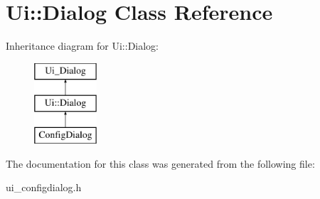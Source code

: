 \hypertarget{class_ui_1_1_dialog}{
\section{Ui::Dialog Class Reference}
\label{class_ui_1_1_dialog}
}
Inheritance diagram for Ui::Dialog:\begin{figure}[H]
\begin{center}
\leavevmode
\includegraphics[height=3.000000cm]{class_ui_1_1_dialog}
\end{center}
\end{figure}


The documentation for this class was generated from the following file:\begin{DoxyCompactItemize}
\item 
ui\_\-configdialog.h\end{DoxyCompactItemize}
